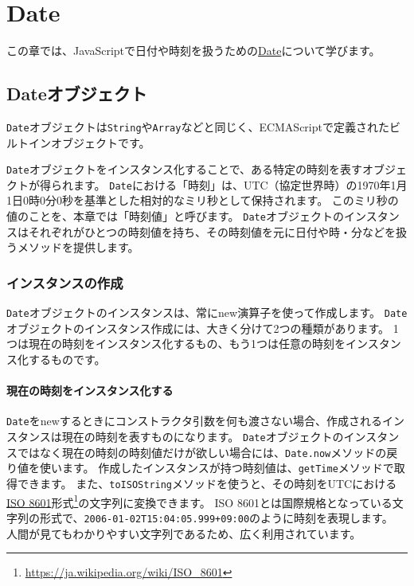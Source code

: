\hypertarget{date}{%
\chapter{Date}\label{date}}
\thispagestyle{frontheadings}

この章では、JavaScriptで日付や時刻を扱うための\href{https://developer.mozilla.org/ja/docs/Web/JavaScript/Reference/Global_Objects/Date}{Date}について学びます。

\hypertarget{date-object}{%
\section{Dateオブジェクト}\label{date-object}}

\texttt{Date}オブジェクトは\texttt{String}や\texttt{Array}などと同じく、ECMAScriptで定義されたビルトインオブジェクトです。

\texttt{Date}オブジェクトをインスタンス化することで、ある特定の時刻を表すオブジェクトが得られます。
\texttt{Date}における「時刻」は、UTC（協定世界時）の1970年1月1日0時0分0秒を基準とした相対的なミリ秒として保持されます。
このミリ秒の値のことを、本章では「時刻値」と呼びます。
\texttt{Date}オブジェクトのインスタンスはそれぞれがひとつの時刻値を持ち、その時刻値を元に日付や時・分などを扱うメソッドを提供します。

\hypertarget{create-instance}{%
\subsection{インスタンスの作成}\label{create-instance}}

\texttt{Date}オブジェクトのインスタンスは、常にnew演算子を使って作成します。
\texttt{Date}オブジェクトのインスタンス作成には、大きく分けて2つの種類があります。
1つは現在の時刻をインスタンス化するもの、もう1つは任意の時刻をインスタンス化するものです。

\hypertarget{instance-current-time}{%
\subsubsection{現在の時刻をインスタンス化する}\label{instance-current-time}}

\texttt{Date}をnewするときにコンストラクタ引数を何も渡さない場合、作成されるインスタンスは現在の時刻を表すものになります。
\texttt{Date}オブジェクトのインスタンスではなく現在の時刻の時刻値だけが欲しい場合には、\texttt{Date.now}メソッドの戻り値を使います。
作成したインスタンスが持つ時刻値は、\texttt{getTime}メソッドで取得できます。
また、\texttt{toISOString}メソッドを使うと、その時刻をUTCにおける\href{https://ja.wikipedia.org/wiki/ISO_8601}{ISO
8601}形式\footnote{\url{https://ja.wikipedia.org/wiki/ISO_8601}}の文字列に変換できます。 ISO
8601とは国際規格となっている文字列の形式で、\texttt{2006-01-02T15:04:05.999+09:00}のように時刻を表現します。
人間が見てもわかりやすい文字列であるため、広く利用されています。

